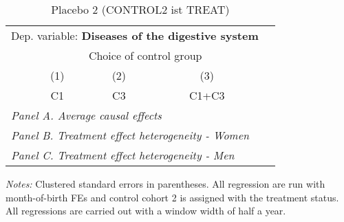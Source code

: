  \begin{table}[H] \centering \begin{threeparttable} \caption{Placebo 2 (CONTROL2 ist TREAT) } {\def\sym#1{\ifmmode^{#1}\else\(^{#1}\)\fi} \begin{tabular}{l*{4}{c}} \toprule \multicolumn{4}{l}{Dep. variable: \textbf{Diseases of the digestive system}} \\ & \multicolumn{3}{c}{Choice of control group} \\ \cmidrule(lr){2-4}
            &\multicolumn{1}{c}{(1)}&\multicolumn{1}{c}{(2)}&\multicolumn{1}{c}{(3)}\\
            &\multicolumn{1}{c}{C1}&\multicolumn{1}{c}{C3}&\multicolumn{1}{c}{C1+C3}\\
\midrule
 \multicolumn{4}{l}{\emph{Panel A. Average causal effects}} \\      \midrule\multicolumn{4}{l}{\emph{Panel B. Treatment effect heterogeneity - Women}} \\      \midrule\multicolumn{4}{l}{\emph{Panel C. Treatment effect heterogeneity - Men}} \\      
\bottomrule \end{tabular} } \begin{tablenotes} \item \scriptsize \emph{Notes:} Clustered standard errors in parentheses. All regression are run with month-of-birth FEs and control cohort 2 is assigned with the treatment status. All regressions are carried out with a window width of half a year. \end{tablenotes} \end{threeparttable} \end{table} 
